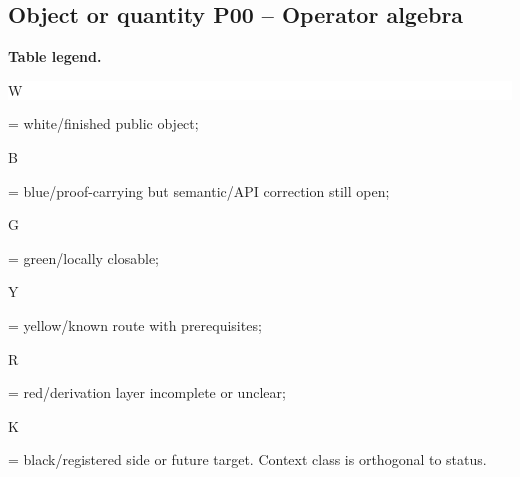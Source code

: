 \subsection*{Object or quantity P00 -- Operator algebra}
\hypertarget{objproof:P00}{}
\par\smallskip\noindent\begin{minipage}{0.99\linewidth}\footnotesize\raggedright\textbf{Table legend.} \colorbox{white}{\strut W} = white/finished public object; \colorbox{cyan!20}{\strut B} = blue/proof-carrying but semantic/API correction still open; \colorbox{green!18}{\strut G} = green/locally closable; \colorbox{yellow!25}{\strut Y} = yellow/known route with prerequisites; \colorbox{red!20}{\strut R} = red/derivation layer incomplete or unclear; \colorbox{black!18}{\strut K} = black/registered side or future target. Context class is orthogonal to status.\end{minipage}\par\vspace{0.25em}
